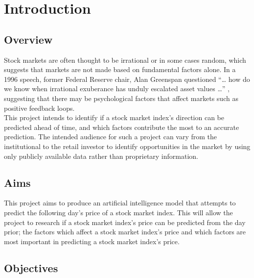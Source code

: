 \chapter{Introduction} \label{chap:introduction}

\section{Overview}

Stock markets are often thought to be irrational or in some cases random,
which suggests that markets are not made based on fundamental factors alone.
In a 1996 speech, former Federal Reserve chair, Alan Greenspan questioned ``… how do we know when irrational exuberance has unduly escalated asset
values …'' \parencite{greenspan1996}, suggesting that there may be
psychological factors that affect markets such as positive feedback loops.\\

This project intends to identify if a stock market index's direction can be predicted ahead
of time, and which factors contribute the most to an accurate prediction.
The intended audience for such a project can vary from the institutional to
the retail investor to identify opportunities in the market by using only
publicly available data rather than proprietary information.

\section{Aims}

This project aims to produce an artificial intelligence model that
attempts to predict the following day's price of a stock market index. This will
allow the project to research if a stock market index's price can be predicted
from the day prior; the factors which affect a stock market index's price and which
factors are most important in predicting a stock market index's price.

\section{Objectives}

